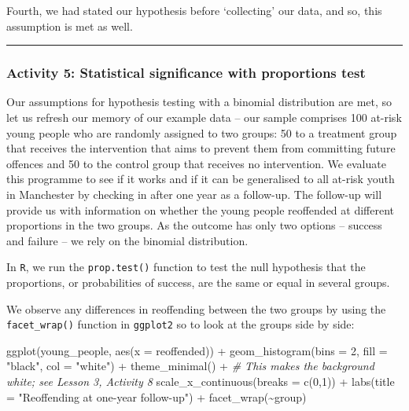 \documentclass[
]{book}
\newenvironment{Shaded}{\begin{snugshade}}{\end{snugshade}}
\newcommand{\AttributeTok}[1]{\textcolor[rgb]{0.77,0.63,0.00}{#1}}
\newcommand{\CommentTok}[1]{\textcolor[rgb]{0.56,0.35,0.01}{\textit{#1}}}
\newcommand{\DecValTok}[1]{\textcolor[rgb]{0.00,0.00,0.81}{#1}}
\newcommand{\FunctionTok}[1]{\textcolor[rgb]{0.00,0.00,0.00}{#1}}
\newcommand{\NormalTok}[1]{#1}
\newcommand{\SpecialCharTok}[1]{\textcolor[rgb]{0.00,0.00,0.00}{#1}}
\newcommand{\StringTok}[1]{\textcolor[rgb]{0.31,0.60,0.02}{#1}}
\begin{document}
Fourth, we had stated our hypothesis before `collecting' our data, and so, this assumption is met as well.

\begin{center}\rule{0.5\linewidth}{0.5pt}\end{center}

\hypertarget{activity-5-statistical-significance-with-proportions-test}{%
\subsubsection{Activity 5: Statistical significance with proportions test}\label{activity-5-statistical-significance-with-proportions-test}}

Our assumptions for hypothesis testing with a binomial distribution are met, so let us refresh our memory of our example data -- our sample comprises 100 at-risk young people who are randomly assigned to two groups: 50 to a treatment group that receives the intervention that aims to prevent them from committing future offences and 50 to the control group that receives no intervention. We evaluate this programme to see if it works and if it can be generalised to all at-risk youth in Manchester by checking in after one year as a follow-up. The follow-up will provide us with information on whether the young people reoffended at different proportions in the two groups. As the outcome has only two options -- success and failure -- we rely on the binomial distribution.

In \texttt{R}, we run the \texttt{prop.test()} function to test the null hypothesis that the proportions, or probabilities of success, are the same or equal in several groups.

We observe any differences in reoffending between the two groups by using the \texttt{facet\_wrap()} function in \texttt{ggplot2} so to look at the groups side by side:

\begin{Shaded}
\begin{Highlighting}[]
\FunctionTok{ggplot}\NormalTok{(young\_people, }\FunctionTok{aes}\NormalTok{(}\AttributeTok{x =}\NormalTok{ reoffended)) }\SpecialCharTok{+} 
  \FunctionTok{geom\_histogram}\NormalTok{(}\AttributeTok{bins =} \DecValTok{2}\NormalTok{, }\AttributeTok{fill =} \StringTok{"black"}\NormalTok{, }\AttributeTok{col =} \StringTok{"white"}\NormalTok{) }\SpecialCharTok{+} 
  \FunctionTok{theme\_minimal}\NormalTok{() }\SpecialCharTok{+} \CommentTok{\# This makes the background white; see Lesson 3, Activity 8}
  \FunctionTok{scale\_x\_continuous}\NormalTok{(}\AttributeTok{breaks =} \FunctionTok{c}\NormalTok{(}\DecValTok{0}\NormalTok{,}\DecValTok{1}\NormalTok{)) }\SpecialCharTok{+} 
  \FunctionTok{labs}\NormalTok{(}\AttributeTok{title =} \StringTok{"Reoffending at one{-}year follow{-}up"}\NormalTok{) }\SpecialCharTok{+} 
  \FunctionTok{facet\_wrap}\NormalTok{(}\SpecialCharTok{\textasciitilde{}}\NormalTok{group)}
\end{Highlighting}
\end{Shaded}
\end{document}
